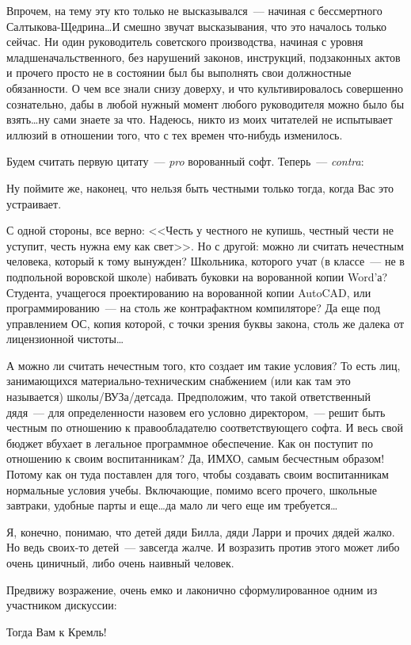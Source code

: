 Впрочем, на тему эту кто только не высказывался~--- начиная с бессмертного Салтыкова-Щедрина\dots И смешно звучат высказывания, что это началось только сейчас. Ни один руководитель советского производства, начиная с уровня младшеначальственного, без нарушений законов, инструкций, подзаконных актов и прочего просто не в состоянии был бы выполнять свои должностные обязанности. О чем все знали снизу доверху, и что культивировалось совершенно сознательно, дабы в любой нужный момент любого руководителя можно было бы взять\dots ну сами знаете за что. Надеюсь, никто из моих читателей не испытывает иллюзий в отношении того, что с тех времен что-нибудь изменилось.

Будем считать первую цитату~--- \textit{pro} ворованный софт. Теперь~--- \textit{contra}:
\begin{shadequote}{}
Ну поймите же, наконец, что нельзя быть честными только тогда, когда Вас это устраивает.
\end{shadequote}
С одной стороны, все верно: <<Честь у честного не купишь, честный чести не уступит, честь нужна ему как свет>>. Но с другой: можно ли считать нечестным человека, который к тому вынужден? Школьника, которого учат (в классе~--- не в подпольной воровской школе) набивать буковки на ворованной копии Word'а? Студента, учащегося проектированию на ворованной копии AutoCAD, или программированию~--- на столь же контрафактном компиляторе? Да еще под управлением ОС, копия которой, с точки зрения буквы закона, столь же далека от лицензионной чистоты\dots

А можно ли считать нечестным того, кто создает им такие условия? То есть лиц, занимающихся материально-техническим снабжением (или как там это называется) школы/ВУЗа/детсада. Предположим, что такой ответственный дядя~--- для определенности назовем его условно директором,~--- решит быть честным по отношению к правообладателю соответствующего софта. И весь свой бюджет вбухает в легальное программное обеспечение. Как он поступит по отношению к своим воспитанникам? Да, ИМХО, самым бесчестным образом! Потому как он туда поставлен для того, чтобы создавать своим воспитанникам нормальные условия учебы. Включающие, помимо всего прочего, школьные завтраки, удобные парты и еще\dots да мало ли чего еще им требуется\dots

Я, конечно, понимаю, что детей дяди Билла, дяди Ларри и прочих дядей жалко. Но ведь своих-то детей~--- завсегда жалче. И возразить против этого может либо очень циничный, либо очень наивный человек.

Предвижу возражение, очень емко и лаконично сформулированное одним из участником дискуссии:
\begin{shadequote}{}
Тогда Вам к Кремль!
\end{shadequote}

